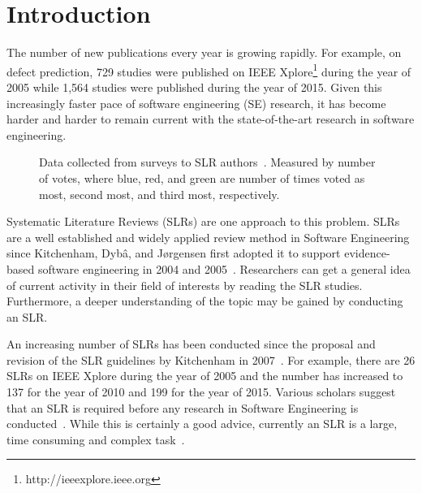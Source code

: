 \documentclass{svjour3}
\theoremstyle{break}
\begin{document}
\section{Introduction}
\label{sect: Introduction}

The number of new publications every year is growing rapidly. For example, on defect
prediction, 729 studies were published on IEEE
Xplore\footnote{http://ieeexplore.ieee.org} during the year of 2005 while 1,564
studies were published during the year of 2015.
Given this increasingly faster pace of software engineering (SE) research,
it has become harder and harder to remain current with
the state-of-the-art research in software engineering.


\begin{figure}[t]
    \centering
    \caption{Data collected from surveys to SLR authors~\cite{carver2013identifying}. Measured by number of votes, where blue, red, and green are number of times voted as most, second most, and third most, respectively.}
    \label{fig:barrier}
\end{figure}
Systematic Literature Reviews
(SLRs) are one approach to this problem. SLRs are a well established and widely
applied review method in Software Engineering since Kitchenham, Dyb{\^{a}}, and
J{\o}rgensen first adopted it to support evidence-based software engineering in
2004 and 2005~\cite{kitchenham2004evidence,1377125}. 
Researchers can get a
general idea of current activity in their field of interests by reading the SLR
studies. Furthermore, a
deeper understanding of the topic may be gained by conducting an SLR.

An increasing number of SLRs has been conducted since the proposal and
revision of the SLR guidelines by Kitchenham in 2007~\cite{keele2007guidelines}. For
example, there are 26 SLRs on IEEE Xplore during the year of 2005 and the
number has increased to 137 for the year of 2010 and 199 for the year of
2015. Various scholars  suggest that an SLR is required before any research in Software
Engineering is conducted~\cite{keele2007guidelines}.
While this is certainly a good advice,
currently an SLR is
a large, time consuming and complex
task~\cite{hassler2016identification,hassler2014outcomes,carver2013identifying,bowes2012slurp}.
\end{document}
